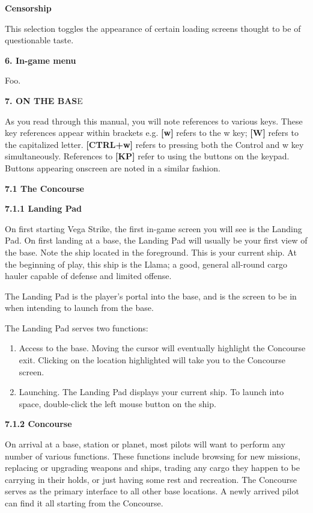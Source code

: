 \documentclass{article}
\begin{document}
\textbf{Censorship}

This selection toggles the appearance of certain loading screens thought to be of questionable taste.  
 




\eject \textbf{6. In-game menu}



Foo.\eject 

\textbf{7. ON THE BAS}E





\eject As you read through this manual, you will note references to various keys. These key references appear within brackets e.g. \textbf{[w]} refers to the w key; \textbf{[W]} refers to the capitalized letter. \textbf{[CTRL+w]} refers to pressing both the Control and w key simultaneously. References to \textbf{[KP] }refer to using the buttons on the keypad.  Buttons appearing onscreen are noted in a similar fashion. 

\textbf{7.1 The Concourse }

\textbf{7.1.1 Landing Pad }

On first starting Vega Strike, the first in-game screen you will see is the Landing Pad. On first landing at a base, the Landing Pad will usually be your first view of the base. Note the ship located in the foreground. This is your current ship. At the beginning of play, this ship is the Llama; a good, general all-round cargo hauler capable of defense and limited offense. 

The Landing Pad is the player's portal into the base, and is the screen to be in when intending to launch from the base. 

The Landing Pad serves two functions: 

\begin{enumerate}
\item  Access to the base. Moving the cursor will eventually highlight the Concourse exit. Clicking on the location highlighted will take you to the Concourse screen. 

\item  Launching. The Landing Pad displays your current ship. To launch into space, double-click the left mouse button on the ship. 
\end{enumerate}



\textbf{7.1.2 Concourse }

On arrival at a base, station or planet, most pilots will want to perform any number of various functions. These functions include browsing for new missions, replacing or upgrading weapons and ships, trading any cargo they happen to be carrying in their holds, or just having some rest and recreation. The Concourse serves as the primary interface to all other base locations. A newly arrived pilot can find it all starting from the Concourse. 
\end{document}
